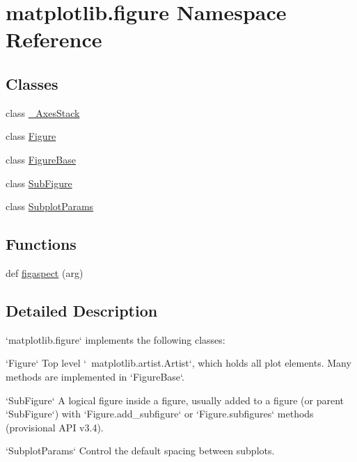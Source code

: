 \hypertarget{namespacematplotlib_1_1figure}{}\section{matplotlib.\+figure Namespace Reference}
\label{namespacematplotlib_1_1figure}
\subsection*{Classes}
\begin{DoxyCompactItemize}
\item 
class \hyperlink{classmatplotlib_1_1figure_1_1__AxesStack}{\+\_\+\+Axes\+Stack}
\item 
class \hyperlink{classmatplotlib_1_1figure_1_1Figure}{Figure}
\item 
class \hyperlink{classmatplotlib_1_1figure_1_1FigureBase}{Figure\+Base}
\item 
class \hyperlink{classmatplotlib_1_1figure_1_1SubFigure}{Sub\+Figure}
\item 
class \hyperlink{classmatplotlib_1_1figure_1_1SubplotParams}{Subplot\+Params}
\end{DoxyCompactItemize}
\subsection*{Functions}
\begin{DoxyCompactItemize}
\item 
def \hyperlink{namespacematplotlib_1_1figure_a5efc30798fd5c25c106bb06e2e19cafd}{figaspect} (arg)
\end{DoxyCompactItemize}


\subsection{Detailed Description}
\begin{DoxyVerb}`matplotlib.figure` implements the following classes:

`Figure`
    Top level `~matplotlib.artist.Artist`, which holds all plot elements.
    Many methods are implemented in `FigureBase`.

`SubFigure`
    A logical figure inside a figure, usually added to a figure (or parent
    `SubFigure`) with `Figure.add_subfigure` or `Figure.subfigures` methods
    (provisional API v3.4).

`SubplotParams`
    Control the default spacing between subplots.
\end{DoxyVerb}
 

